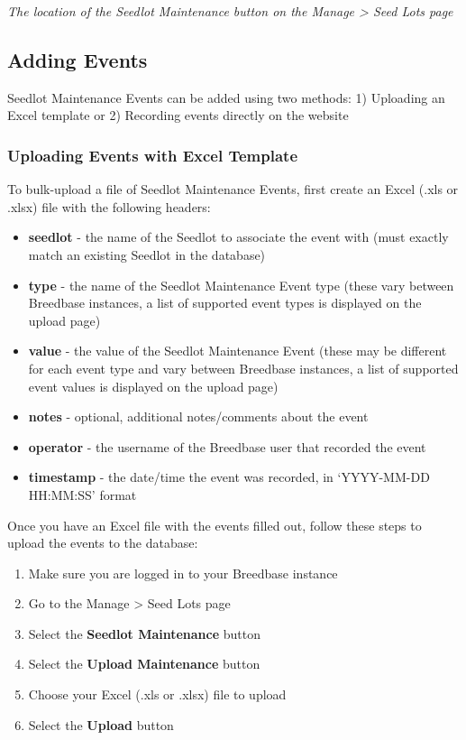 \documentclass[
  12pt,
]{book}
\providecommand{\tightlist}{%
  \setlength{\itemsep}{0pt}\setlength{\parskip}{0pt}}
\begin{document}
\emph{The location of the Seedlot Maintenance button on the Manage \textgreater{} Seed Lots page}

\hypertarget{adding-events}{%
\subsection{Adding Events}\label{adding-events}}

Seedlot Maintenance Events can be added using two methods: 1) Uploading an Excel template or 2) Recording events directly on the website

\hypertarget{uploading-events-with-excel-template}{%
\subsubsection*{Uploading Events with Excel Template}\label{uploading-events-with-excel-template}}


To bulk-upload a file of Seedlot Maintenance Events, first create an Excel (.xls or .xlsx) file with the following headers:

\begin{itemize}
\tightlist
\item
  \textbf{seedlot} - the name of the Seedlot to associate the event with (must exactly match an existing Seedlot in the database)
\item
  \textbf{type} - the name of the Seedlot Maintenance Event type (these vary between Breedbase instances, a list of supported event types is displayed on the upload page)
\item
  \textbf{value} - the value of the Seedlot Maintenance Event (these may be different for each event type and vary between Breedbase instances, a list of supported event values is displayed on the upload page)
\item
  \textbf{notes} - optional, additional notes/comments about the event
\item
  \textbf{operator} - the username of the Breedbase user that recorded the event
\item
  \textbf{timestamp} - the date/time the event was recorded, in `YYYY-MM-DD HH:MM:SS' format
\end{itemize}

Once you have an Excel file with the events filled out, follow these steps to upload the events to the database:

\begin{enumerate}
\def\labelenumi{\arabic{enumi}.}
\tightlist
\item
  Make sure you are logged in to your Breedbase instance
\item
  Go to the Manage \textgreater{} Seed Lots page
\item
  Select the \textbf{Seedlot Maintenance} button
\item
  Select the \textbf{Upload Maintenance} button
\item
  Choose your Excel (.xls or .xlsx) file to upload
\item
  Select the \textbf{Upload} button
\end{enumerate}
\end{document}
